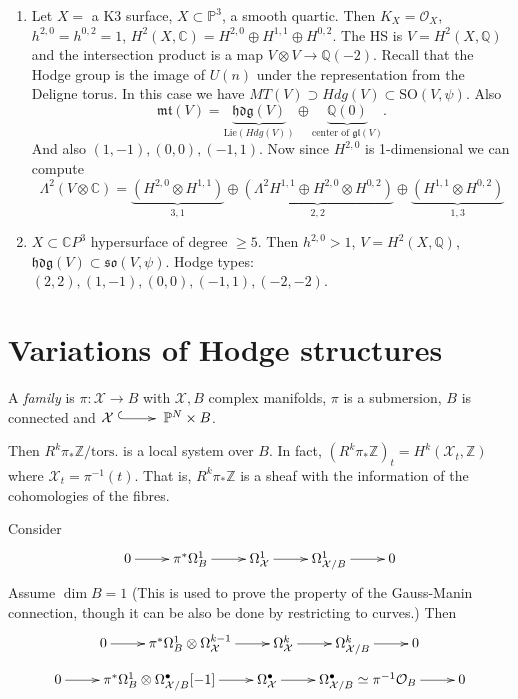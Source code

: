 \begin{example}
\label{example-hodge-type-prop}
\begin{enumerate}
\item Let $X=$ a K3 surface, $X \subset
\mathbb{P}^3$, a smooth quartic.
Then $K_X=\mathcal{O}_X$,
$h^{2,0}=h^{0,2}=1$,
$H^2(X,\mathbb{C})=H^{2,0}\oplus
H^{1,1}\oplus H^{0,2}$.
The HS is $V=H^2(X,\mathbb{Q})$
and the intersection product is a map
$V \otimes V \to \mathbb{Q}(-2)$.
Recall that the Hodge group is the image of
$U(n)$ under the representation
from the Deligne torus.
In this case we have
$MT(V) \supset Hdg(V)\subset
\text{SO}(V,\psi)$.
Also
$$
\mathfrak{mt}(V)=\underbrace{\mathfrak{hdg}
(V)}_{\text{Lie}(Hdg(V))}
\oplus
\underbrace{\mathbb{Q}(0)}_{\text{center
of }\mathfrak{gl}(V)}.
$$
And also $(1,-1),(0,0),(-1,1)$.
Now since $H^{2,0}$ is 1-dimensional we can
compute
$$
\Lambda^2(V \otimes \mathbb{C})
=\underbrace{(H^{2,0}\otimes H^{1,1})}_{3,1}
\oplus \underbrace{(\Lambda^2H^{1,1}\oplus
H^{2,0}\otimes H^{0,2})}_{2,2}
\oplus\underbrace{(H^{1,1}\otimes
H^{0,2})}_{1,3}
$$
\item $X \subset \mathbb{C}P^3$ hypersurface
of degree $\geq 5$.
Then $h^{2,0}>1$, $V=H^2(X,\mathbb{Q})$,
$\mathfrak{hdg}(V) \subset
\mathfrak{so}(V,\psi)$.
Hodge types:
$(2,2),(1,-1),(0,0),(-1,1),(-2,-2)$.
\end{enumerate}
\end{example}

\section{Variations of Hodge structures}
\label{section-variations-of-hs}

\noindent
A {\it family} is $\pi:\mathcal{X} \to B$
with $\mathcal{X},B$ complex
manifolds, $\pi$ is a submersion, $B$ is
connected
and $\mathcal{X} \xymatrix{\ar@{^{(}->}[r]&}
\mathbb{P}^N \times B$.

Then $R^k\pi_*\mathbb{Z}/\text{tors.}$ is a
local system over $B$.
In fact,
$(R^k\pi_*\mathbb{Z})_t=H^k(\mathcal{X}_t,
\mathbb{Z})$
where $\mathcal{X}_t=\pi^{-1}(t)$.
That is, $R^k\pi_*\mathbb{Z}$ is a sheaf with
the information
of the cohomologies of the fibres.

\medskip\noindent
Consider
$$
\xymatrix{
0\ar[r]
&\pi^*\Omega^1_B\ar[r]
&\Omega^1_\mathcal{X}\ar[r]
&\Omega_{\mathcal{X}/B}^1\ar[r]
&0
}
$$
Assume $\dim B=1$
(This is used to prove the property of the
Gauss-Manin connection, though it can be
also be done by restricting to curves.)
Then
$$
\xymatrix{
0\ar[r]
&\pi^*\Omega^1_B \otimes
\Omega_{\mathcal{X}}^{k-1}\ar[r]
&\Omega_{\mathcal{X}}^k\ar[r]
&\Omega_{\mathcal{X}/B}^k\ar[r]
&0
}
$$
\begin{equation}
\label{equation-diagram3}
\xymatrix{
0\ar[r]
&\pi^*\Omega_B^1 \otimes
\Omega_{\mathcal{X}/B}^\bullet[-1]\ar[r]
&\Omega_{\mathcal{X}}^\bullet\ar[r]
&\Omega^\bullet_{\mathcal{X}/B}\simeq
\pi^{-1}\mathcal{O}_B\ar[r]
&0
}
\end{equation}

